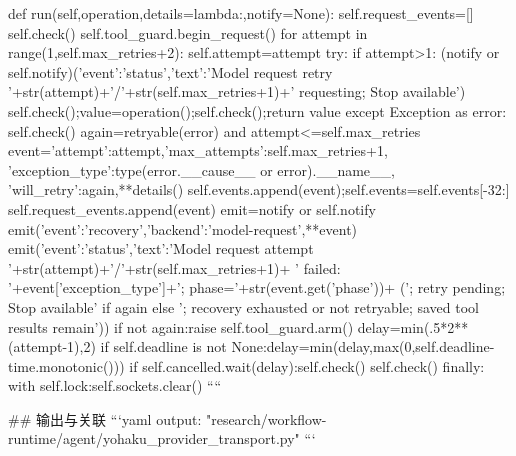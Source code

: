     def run(self,operation,details=lambda:{},notify=None):
        self.request_events=[]
        self.check()
        self.tool_guard.begin_request()
        for attempt in range(1,self.max_retries+2):
            self.attempt=attempt
            try:
                if attempt>1:
                    (notify or self.notify)({'event':'status','text':'Model request retry '+str(attempt)+'/'+str(self.max_retries+1)+' requesting; Stop available'})
                self.check();value=operation();self.check();return value
            except Exception as error:
                self.check()
                again=retryable(error) and attempt<=self.max_retries
                event={'attempt':attempt,'max_attempts':self.max_retries+1,
                    'exception_type':type(error.__cause__ or error).__name__,
                    'will_retry':again,**details()}
                self.events.append(event);self.events=self.events[-32:]
                self.request_events.append(event)
                emit=notify or self.notify
                emit({'event':'recovery','backend':'model-request',**event})
                emit({'event':'status','text':'Model request attempt '+str(attempt)+'/'+str(self.max_retries+1)+
                    ' failed: '+event['exception_type']+'; phase='+str(event.get('phase'))+
                    ('; retry pending; Stop available' if again else '; recovery exhausted or not retryable; saved tool results remain')})
                if not again:raise
                self.tool_guard.arm()
                delay=min(.5*2**(attempt-1),2)
                if self.deadline is not None:delay=min(delay,max(0,self.deadline-time.monotonic()))
                if self.cancelled.wait(delay):self.check()
                self.check()
            finally:
                with self.lock:self.sockets.clear()
````

## 输出与关联
```yaml
output: "research/workflow-runtime/agent/yohaku_provider_transport.py"
```
